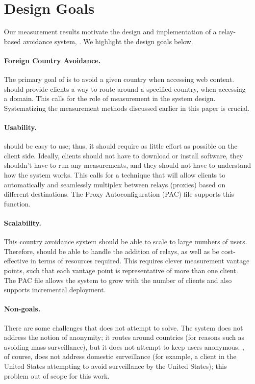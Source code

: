\section{Design Goals}
\label{goals}

Our measurement results motivate 
 the design and implementation of a relay-based avoidance system,
\system{}.  We highlight the design goals
\system{} below.

\paragraph{Foreign Country Avoidance.}  The primary goal of \system{} is to avoid a given
 country when accessing web content.  \system{} should provide clients a way to 
route around a specified country, when accessing a
domain.  This calls for the role of measurement in the system design.  Systematizing 
the measurement methods discussed earlier in this paper is crucial.

\paragraph{Usability.} \system{} should be easy to use; thus, it should
require as little effort as possible on the client side.  Ideally,
clients should not have to download
or install software, they shouldn't have to run any measurements,
and they should not have to understand how the system works.  This calls
for a technique that will allow clients to automatically and seamlessly multiplex between relays
(proxies) based on different destinations.  The Proxy Autoconfiguration (PAC) file
supports this function.

\paragraph{Scalability.}  This country avoidance system should be able to scale to 
large numbers of users.  Therefore, \system{} should be able to handle the addition
 of relays, as well as be cost-effective in terms of resources required. This requires 
clever measurement vantage points, such that each vantage point is representative of 
more than one client.  The PAC file allows the system to 
grow with the number of clients and also supports incremental deployment.

\paragraph{Non-goals.}  There are some challenges that \system{} does not attempt to 
solve.  The system does not address the notion of anonymity; it routes around 
countries (for reasons such as avoiding mass surveillance), but it does not 
attempt to keep users anonymous.  
\system{}, of course, does not address domestic surveillance (for 
example, a client in the United States attempting to avoid surveillance by the 
United States); this problem
out of scope for this work.
